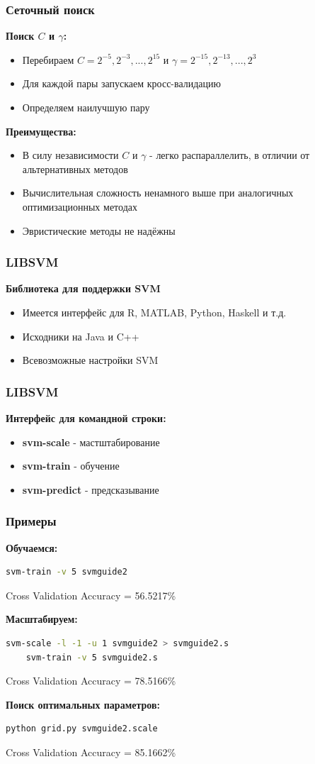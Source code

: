 \begin{frame}
\frametitle{Сеточный поиск}
	\textbf{Поиск $C$ и $\gamma$:}
	\begin{itemize}
		\item Перебираем $C = 2^{-5}, 2^{-3},...,2^{15}$ и $\gamma = 2^{-15},2^{-13},...,2^{3}$
		\item Для каждой пары запускаем кросс-валидацию
		\item Определяем наилучшую пару
	\end{itemize}
	\textbf{Преимущества:}
	\begin{itemize}
		\item В силу независимости $C$ и $\gamma$ - легко распараллелить, в отличии от альтернативных методов
		\item Вычислительная сложность ненамного выше при аналогичных оптимизационных методах
		\item Эвристические методы не надёжны
	\end{itemize}
\end{frame}


\begin{frame}
\frametitle{LIBSVM}
	\textbf{Библиотека для поддержки SVM}
	\begin{itemize}
		\item Имеется интерфейс для R, MATLAB, Python, Haskell и т.д.
		\item Исходники на Java и C++
		\item Всевозможные настройки SVM
	\end{itemize}
\end{frame}

\begin{frame}
\frametitle{LIBSVM}
	\textbf{Интерфейс для командной строки:}
	\begin{itemize}
		\item \textbf{svm-scale} - мастштабирование
		\item \textbf{svm-train} - обучение
		\item \textbf{svm-predict} - предсказывание
	\end{itemize}
\end{frame}



\begin{frame}[fragile]
\frametitle{Примеры}
	\textbf{Обучаемся:}
	\begin{lstlisting}[language=bash]
	svm-train -v 5 svmguide2
	\end{lstlisting}
	Cross Validation Accuracy = 56.5217\%

	\textbf{Масштабируем:}
	\begin{lstlisting}[language=bash]
    svm-scale -l -1 -u 1 svmguide2 > svmguide2.s
    svm-train -v 5 svmguide2.s
	\end{lstlisting}
	Cross Validation Accuracy = 78.5166\%

	\textbf{Поиск оптимальных параметров:}
	\begin{lstlisting}[language=bash]
    python grid.py svmguide2.scale
	\end{lstlisting}
	Cross Validation Accuracy = 85.1662\%
\end{frame}





